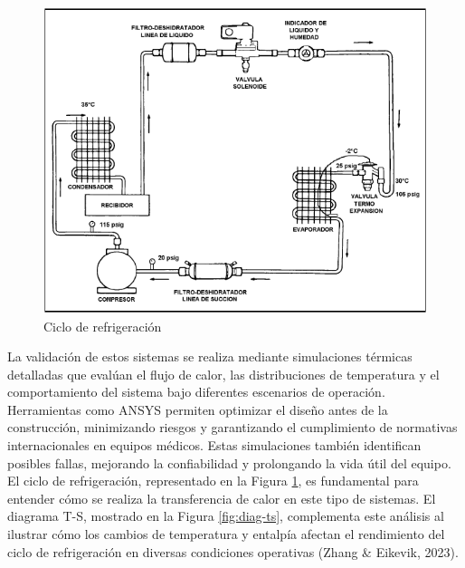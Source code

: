 \documentclass[11pt,a4paper]{article}
\begin{document}
\begin{multicols}{2}
\begin{figure}[H]
	\includegraphics[width=\linewidth]{figures/ciclo-ref.png}
	\caption{Ciclo de refrigeración}
	\label{fig:ciclo}	
\end{figure} La validación de estos sistemas se realiza mediante simulaciones térmicas detalladas que evalúan el flujo de calor, las distribuciones de temperatura y el comportamiento del sistema bajo diferentes escenarios de operación. Herramientas como ANSYS permiten optimizar el diseño antes de la construcción, minimizando riesgos y garantizando el cumplimiento de normativas internacionales en equipos médicos. Estas simulaciones también identifican posibles fallas, mejorando la confiabilidad y prolongando la vida útil del equipo. El ciclo de refrigeración, representado en la Figura \ref{fig:ciclo}, es fundamental para entender cómo se realiza la transferencia de calor en este tipo de sistemas. El diagrama T-S, mostrado en la Figura \ref{fig:diag-ts}, complementa este análisis al ilustrar cómo los cambios de temperatura y entalpía afectan el rendimiento del ciclo de refrigeración en diversas condiciones operativas (Zhang \& Eikevik, 2023).



\end{multicols}
\end{document}
